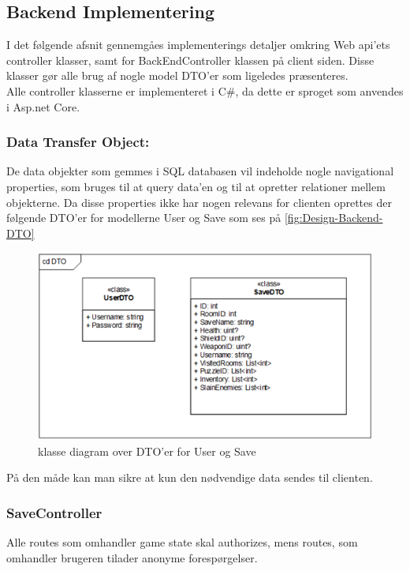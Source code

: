 \subsection{Backend Implementering}

I det følgende afsnit gennemgåes implementerings detaljer omkring Web api'ets controller klasser, samt for BackEndController klassen på client siden. Disse klasser gør alle brug af nogle model DTO'er som ligeledes præsenteres.\\

Alle controller klasserne er implementeret i C\#, da dette er sproget som anvendes i Asp.net Core. \\

\subsubsection{Data Transfer Object:}

De data objekter som gemmes i SQL databasen vil indeholde nogle navigational properties, som bruges til at query data’en og til at opretter relationer mellem objekterne. Da disse properties ikke har nogen relevans for clienten oprettes der følgende DTO’er for modellerne User og Save som ses på \autoref{fig:Design-Backend-DTO}\\

\begin{figure}[H]
\centering
\includegraphics[width = \textwidth]{02-Body/Images/Backend_DTO.PNG}
\caption{klasse diagram over DTO'er for User og Save}
\label{fig:Design-Backend-DTO}
\end{figure}

På den måde kan man sikre at kun den nødvendige data sendes til clienten.\\

\subsubsection{SaveController}
Alle routes som omhandler game state skal authorizes, mens routes, som omhandler brugeren tilader anonyme forespørgelser.

